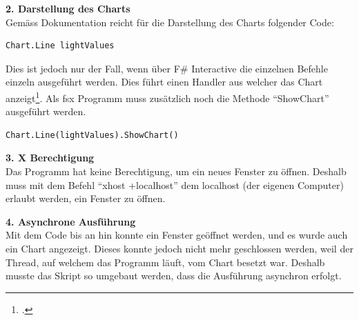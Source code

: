 \textbf{2. Darstellung des Charts} \\
Gemäss Dokumentation reicht für die Darstellung des Charts folgender Code:
\begin{lstlisting}
Chart.Line lightValues
\end{lstlisting}
Dies ist jedoch nur der Fall, wenn über F\# Interactive die einzelnen Befehle einzeln ausgeführt werden. Dies führt einen Handler aus welcher das Chart anzeigt\footcite{FSharp_Charting_Point_and_Line_Charts_2016-06-18}. Als fsx Programm muss zusätzlich noch die Methode "`ShowChart"' ausgeführt werden.

\begin{lstlisting}
Chart.Line(lightValues).ShowChart()
\end{lstlisting}

\textbf{3. X Berechtigung} \\
Das Programm hat keine Berechtigung, um ein neues Fenster zu öffnen. Deshalb muss mit dem Befehl "`xhost +localhost"' dem localhost (der eigenen Computer) erlaubt werden, ein Fenster zu öffnen.

\textbf{4. Asynchrone Ausführung} \\
Mit dem Code bis an hin konnte ein Fenster geöffnet werden, und es wurde auch ein Chart angezeigt. Dieses konnte jedoch nicht mehr geschlossen werden, weil der Thread, auf welchem das Programm läuft, vom Chart besetzt war. Deshalb musste das Skript so umgebaut werden, dass die Ausführung asynchron erfolgt.

